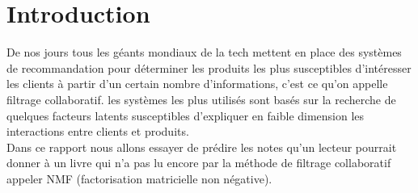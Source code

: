 \documentclass[12pt,letterpaper,twocolumn]{article}
\begin{document}
\section{Introduction}
\par \vspace{1mm}
\justify
 
De nos jours tous les géants mondiaux de la tech mettent en place des systèmes de recommandation pour déterminer les produits les plus susceptibles d’intéresser les clients à partir d’un certain nombre d’informations, c'est ce qu'on appelle filtrage collaboratif. les systèmes les plus utilisés sont basés sur la recherche de quelques facteurs latents susceptibles d’expliquer en faible dimension les interactions entre clients et produits. \\
Dans ce rapport nous allons essayer de prédire les notes qu'un lecteur pourrait donner à un livre qui n'a pas lu encore par la méthode de filtrage collaboratif appeler NMF (factorisation matricielle non négative).\\
\end{document}
